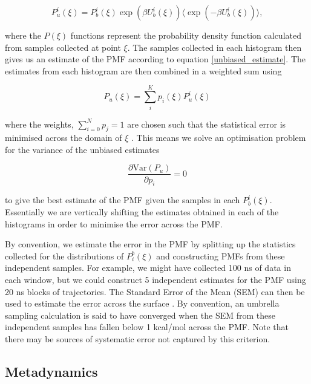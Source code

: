 \begin{equation}
	P_u^i(\xi) = P_b^i(\xi) \exp(\beta U_{b}^i (\xi)) \langle \exp(-\beta U_b^i (\xi))\rangle,
\end{equation}

where the $P(\xi)$  functions represent the probability density function calculated from samples collected at point $\xi$. The samples collected in each histogram then gives us an estimate of the PMF according to equation \ref{unbiased_estimate}. The estimates from each histogram are then combined in a weighted sum using

\begin{equation}
	P_u(\xi) = \sum_i^K p_i(\xi)P_u^i (\xi)
\end{equation}

where the weights, $\sum_{i=0}^N p_j = 1$ are chosen such that the statistical error is minimised across the domain of $\xi$ \cite{chen2011}. This means we solve an optimisation problem for the variance of the unbiased estimates

\begin{equation}
	\frac{\partial\text{Var} (P_u)}{\partial p_i} = 0
\end{equation}

to give the best estimate of the PMF given the samples in each $P_b^i(\xi)$. Essentially we are vertically shifting the estimates obtained in each of the histograms in order to minimise the error across the PMF. 

By convention, we estimate the error in the PMF by splitting up the statistics collected for the distributions of $P^b_i (\xi)$ and constructing PMFs from these independent samples. For example, we might have collected 100 ns of data in each window, but we could construct 5 independent estimates for the PMF using 20 ns blocks of trajectories. The Standard Error of the Mean (SEM) can then be used to estimate the error across the surface \cite{gapsys2020}. By convention, an umbrella sampling calculation is said to have converged when the SEM from these independent samples has fallen below 1 kcal/mol across the PMF. Note that there may be sources of systematic error not captured by this criterion. 

\subsection{Metadynamics}

